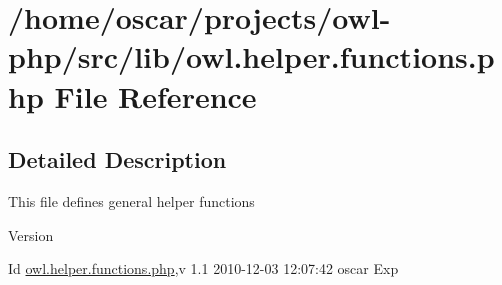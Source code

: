\section{/home/oscar/projects/owl-\/php/src/lib/owl.helper.functions.php File Reference}
\label{owl_8helper_8functions_8php}


\subsection{Detailed Description}
This file defines general helper functions \begin{DoxyVersion}{Version}

\end{DoxyVersion}
\begin{DoxyParagraph}{Id}
\hyperlink{owl_8helper_8functions_8php}{owl.helper.functions.php},v 1.1 2010-\/12-\/03 12:07:42 oscar Exp 
\end{DoxyParagraph}

